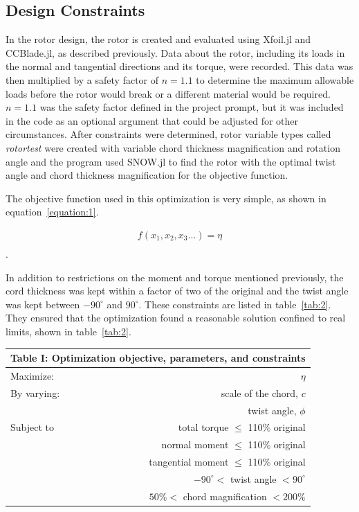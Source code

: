 \documentclass[journal ]{new-aiaa}
\begin{document}
\subsection{Design Constraints}

In the rotor design, the rotor is created and evaluated using Xfoil.jl and CCBlade.jl, as described previously. Data about the rotor, including its loads in the normal and tangential directions and its torque, were recorded. This data was then multiplied by a safety factor of $n=1.1$ to determine the maximum allowable loads before the rotor would break or a different material would be required. $n=1.1$ was the safety factor defined in the project prompt, but it was included in the code as an optional argument that could be adjusted for other circumstances. After constraints were determined, rotor variable types called \emph{rotortest} were created with variable chord thickness magnification and rotation angle and the program used SNOW.jl to find the rotor with the optimal twist angle and chord thickness magnification for the objective function.

The objective function used in this optimization is very simple, as shown in equation~\eqref{equation:1}. 

\begin{equation}
	\begin{aligned}
	\label{equation:1}
	f(x_{1}, x_{2}, x_{3}...) = \eta \\
	\end{aligned}
\end{equation}.

In addition to restrictions on the moment and torque mentioned previously, the cord thickness was kept within a factor of two of the original and the twist angle was kept between $-90^{\circ}$ and $90^{\circ}$. These constraints are listed in table~\eqref{tab:2}. They ensured that the optimization found a reasonable solution confined to real limits, shown in table~\eqref{tab:2}.

\begin{center}
\label{tab:2}
\begin{tabular}{l  r}
	 \multicolumn{2}{c}{Table I: Optimization objective, parameters, and constraints}  \\ \hline
  	Maximize: & $\eta$ \\ \hline
  	By varying: & scale of the chord, $c$ \\ 
  	 & twist angle, $\phi$ \\  \hline
  	Subject to & total torque $\leq$ 110\% original \\ 
	 & normal moment $\leq$ 110\% original \\ 
	 & tangential moment $\leq$ 110\% original \\ 
	 & $-90^{\circ} <$ twist angle $< 90^{\circ}$ \\
	 & $50\% <$ chord magnification $< 200\% $ \\ \hline
\end{tabular}
\end{center}
\end{document}

